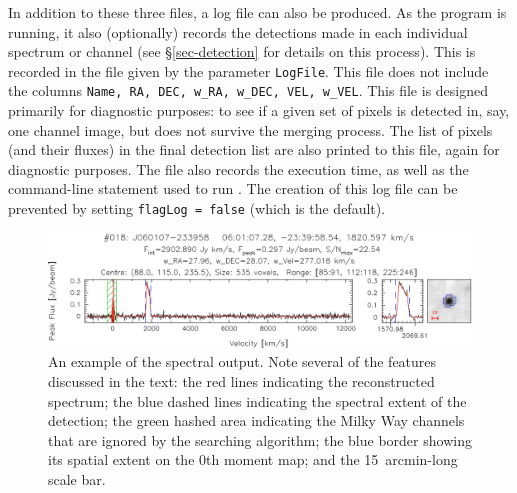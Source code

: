 In addition to these three files, a log file can also be produced. As
the program is running, it also (optionally) records the detections
made in each individual spectrum or channel (see \S\ref{sec-detection}
for details on this process). This is recorded in the file given by
the parameter \texttt{LogFile}. This file does not include the columns
\texttt{Name, RA, DEC, w\_RA, w\_DEC, VEL, w\_VEL}. This file is
designed primarily for diagnostic purposes: \eg to see if a given set
of pixels is detected in, say, one channel image, but does not survive
the merging process. The list of pixels (and their fluxes) in the
final detection list are also printed to this file, again for
diagnostic purposes. The file also records the execution time, as well
as the command-line statement used to run \duchamp. The creation of
this log file can be prevented by setting \texttt{flagLog = false}
(which is the default).


\begin{figure}[t]
  \begin{center}
    \includegraphics[width=\textwidth]{example_spectrum}
  \end{center}
  \caption{\footnotesize An example of the spectral output. Note several
    of the features discussed in the text: the red lines indicating the
    reconstructed spectrum; the blue dashed lines indicating the
    spectral extent of the detection; the green hashed area indicating
    the Milky Way channels that are ignored by the searching algorithm;
    the blue border showing its spatial extent on the 0th moment map;
    and the 15~arcmin-long scale bar.}
  \label{fig-spect}
\end{figure}

